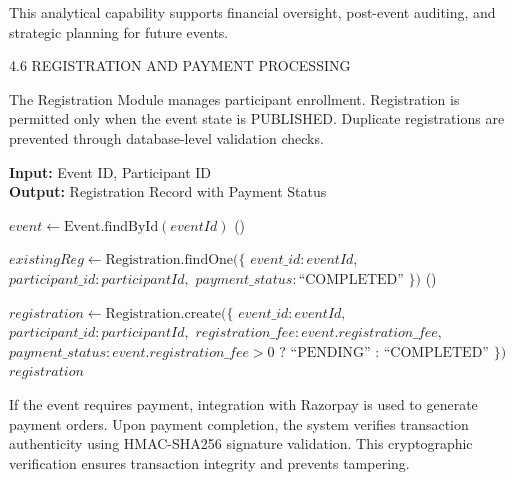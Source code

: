 This analytical capability supports financial oversight, post-event auditing, and strategic planning for future events.

4.6 REGISTRATION AND PAYMENT PROCESSING

The Registration Module manages participant enrollment. Registration is permitted only when the event state is PUBLISHED. Duplicate registrations are prevented through database-level validation checks.

\begin{algorithm}[H]
\caption{Event Registration Process}
\label{alg:event_registration}
\textbf{Input:} Event ID, Participant ID\\
\textbf{Output:} Registration Record with Payment Status
\begin{algorithmic}[1]
    \State $event \gets \text{Event.findById}(eventId)$
        \State \Return {}()
    \EndIf
    
    \State $existingReg \gets \text{Registration.findOne}(\{$
    \State \hspace{1em} $event\_id: eventId,$
    \State \hspace{1em} $participant\_id: participantId,$
    \State \hspace{1em} $payment\_status: \text{``COMPLETED''}$
    \State $\})$
        \State \Return {}()
    \EndIf
    
    \State $registration \gets \text{Registration.create}(\{$
    \State \hspace{1em} $event\_id: eventId,$
    \State \hspace{1em} $participant\_id: participantId,$
    \State \hspace{1em} $registration\_fee: event.registration\_fee,$
    \State \hspace{1em} $payment\_status: event.registration\_fee > 0 \text{ ? ``PENDING'' : ``COMPLETED''}$
    \State $\})$
    \State \Return $registration$
\EndFunction
\end{algorithmic}
\end{algorithm}

If the event requires payment, integration with Razorpay is used to generate payment orders. Upon payment completion, the system verifies transaction authenticity using HMAC-SHA256 signature validation. This cryptographic verification ensures transaction integrity and prevents tampering.

